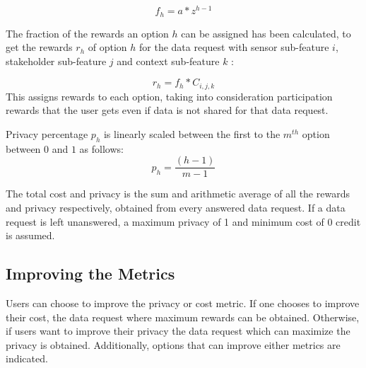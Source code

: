 \begin{equation}
f_{h} = a * z^{h-1}
\end{equation}

The fraction of the rewards an option $h$ can be assigned has been calculated, to get the rewards $r_{h}$ of option $h$ for the data request with sensor sub-feature $i$, stakeholder sub-feature $j$ and
context sub-feature $k$ :

\begin{equation}
r_{h} = f_{h} * C_{i,j,k}
\end{equation}
This assigns rewards to each option, taking into consideration participation rewards that the user gets even if data is not shared for that data request.

Privacy percentage $p_{h}$ is linearly scaled between the first to the $m^{th}$ option between $0$ and $1$ as follows:
\begin{equation}
p_{h} = \frac{(h-1)}{m-1}
\end{equation}

The total cost and privacy is the sum and arithmetic average of all the rewards and privacy respectively, obtained from every answered data request. If a data request is left unanswered, a maximum privacy of 1 and minimum cost of 0 credit is assumed.


\subsection{Improving the Metrics}
Users can choose to improve the privacy or cost metric. If one chooses to improve their cost, the data request where maximum rewards can be obtained. Otherwise, if users want to improve their privacy the data request which can maximize the privacy is obtained. Additionally, options that can improve either metrics are indicated.

